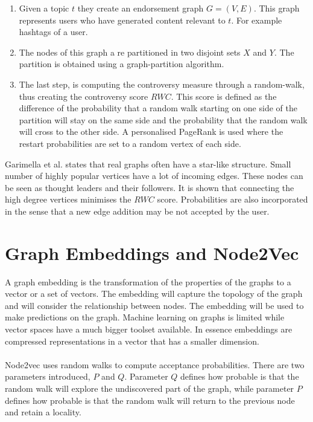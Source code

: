 \begin{enumerate}
  \item Given a topic $t$ they create an endorsement graph $G=(V,E)$. This graph represents users who have generated content relevant to $t$. For example hashtags of a user.
  
  \item The nodes of this graph a re partitioned in two disjoint sets $X$ and $Y$. The partition is obtained using a graph-partition algorithm.
  
  \item The last step, is computing the controversy measure through a random-walk, thus creating the controversy score $RWC$. This score is defined as the difference of the probability that a random walk starting on one side of the partition will stay on the same side and the probability that the random walk will cross to the other side. A personalised PageRank is used where the restart probabilities are set to a random vertex of each side.
\end{enumerate}
\vspace{4pt}
Garimella et al. states that real graphs often have a star-like structure. Small number of highly popular vertices have a lot of incoming edges. These nodes can be seen as thought leaders and their followers. It is shown that connecting the high degree vertices minimises the $RWC$ score. Probabilities are also incorporated in the sense that a new edge addition may be not accepted by the user. \cite{garimella}

\section{Graph Embeddings and Node2Vec}		
\label{sec:embeddings}		

A graph embedding \cite{Leskovec} is the transformation of the properties of the graphs to a vector or a set of vectors. The embedding will capture the topology of the graph and will consider the relationship between nodes. The embedding will be used to make predictions on the graph. Machine learning on graphs is limited while vector spaces have a much bigger toolset available. In essence embeddings are compressed representations in a vector that has a smaller dimension.		
\\
\\
Node2vec uses random walks to compute acceptance probabilities. There are two parameters introduced, $P$ and $Q$. Parameter $Q$ defines how probable is that the random walk will explore the undiscovered part of the graph, while parameter $P$ defines how probable is that the random walk will return to the previous node and retain a locality.
